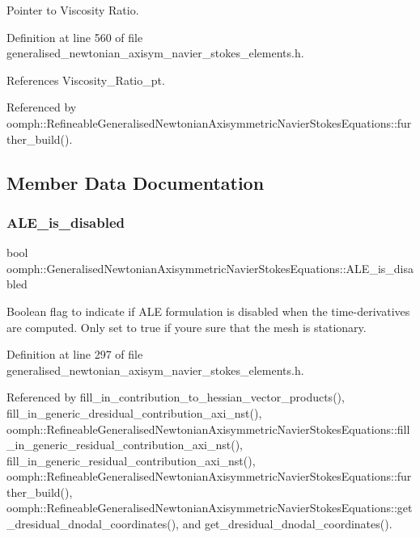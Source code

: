 Pointer to Viscosity Ratio. 



Definition at line 560 of file generalised\+\_\+newtonian\+\_\+axisym\+\_\+navier\+\_\+stokes\+\_\+elements.\+h.



References Viscosity\+\_\+\+Ratio\+\_\+pt.



Referenced by oomph\+::\+Refineable\+Generalised\+Newtonian\+Axisymmetric\+Navier\+Stokes\+Equations\+::further\+\_\+build().



\subsection{Member Data Documentation}
\mbox{\label{classoomph_1_1GeneralisedNewtonianAxisymmetricNavierStokesEquations_af13e702da0e58eba19e840fe648d341d}} 
\subsubsection{\texorpdfstring{A\+L\+E\+\_\+is\+\_\+disabled}{ALE\_is\_disabled}}
{\footnotesize\ttfamily bool oomph\+::\+Generalised\+Newtonian\+Axisymmetric\+Navier\+Stokes\+Equations\+::\+A\+L\+E\+\_\+is\+\_\+disabled\hspace{0.3cm}{\ttfamily [protected]}}



Boolean flag to indicate if A\+LE formulation is disabled when the time-\/derivatives are computed. Only set to true if you\textquotesingle{}re sure that the mesh is stationary. 



Definition at line 297 of file generalised\+\_\+newtonian\+\_\+axisym\+\_\+navier\+\_\+stokes\+\_\+elements.\+h.



Referenced by fill\+\_\+in\+\_\+contribution\+\_\+to\+\_\+hessian\+\_\+vector\+\_\+products(), fill\+\_\+in\+\_\+generic\+\_\+dresidual\+\_\+contribution\+\_\+axi\+\_\+nst(), oomph\+::\+Refineable\+Generalised\+Newtonian\+Axisymmetric\+Navier\+Stokes\+Equations\+::fill\+\_\+in\+\_\+generic\+\_\+residual\+\_\+contribution\+\_\+axi\+\_\+nst(), fill\+\_\+in\+\_\+generic\+\_\+residual\+\_\+contribution\+\_\+axi\+\_\+nst(), oomph\+::\+Refineable\+Generalised\+Newtonian\+Axisymmetric\+Navier\+Stokes\+Equations\+::further\+\_\+build(), oomph\+::\+Refineable\+Generalised\+Newtonian\+Axisymmetric\+Navier\+Stokes\+Equations\+::get\+\_\+dresidual\+\_\+dnodal\+\_\+coordinates(), and get\+\_\+dresidual\+\_\+dnodal\+\_\+coordinates().

